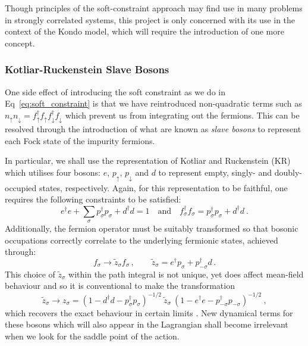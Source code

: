 Though principles of the soft-constraint approach may find use in many problems in strongly correlated systems, this project is only concerned with its use in the context of the Kondo model, which will require the introduction of one more concept.

\subsubsection{Kotliar-Ruckenstein Slave Bosons}

One side effect of introducing the soft constraint as we do in Eq~\eqref{eq:soft_constraint} is that we have reintroduced non-quadratic terms such as $ n_{\uparrow} n_{\downarrow} = f^{\dagger}_{\uparrow} f^{}_{\uparrow} f^{\dagger}_{\downarrow} f^{}_{\downarrow} $ which prevent us from integrating out the fermions. This can be resolved through the introduction of what are known as \emph{slave bosons} \cite{SlaveBosons} to represent each Fock state of the impurity fermions.

In particular, we shall use the representation of Kotliar and Ruckenstein (KR) \cite{KotliarRuckenstein} which utilises four bosons: $ e $, $ p_{\uparrow} $, $ p_{\downarrow} $ and $ d $ to represent empty, singly- and doubly-occupied states, respectively. Again, for this representation to be faithful, one requires the following constraints to be satisfied:
\begin{equation}
e^{\dagger} e + \sum_{\sigma} p^{\dagger}_{\sigma} p^{}_{\sigma} + d^{\dagger} d = 1 \quad \text{and} \quad f^{\dagger}_{\sigma} f^{}_{\sigma} = p^{\dagger}_{\sigma} p^{}_{\sigma} + d^{\dagger} d ~.
\end{equation}
Additionally, the fermion operator must be suitably transformed so that bosonic  occupations correctly correlate to the underlying fermionic states, achieved through:
\begin{equation}
f^{}_{\sigma} \rightarrow \widetilde{z}^{}_{\sigma} f^{}_{\sigma}\,, \qquad \widetilde{z}_{\sigma} = e^{\dagger} p^{}_{\sigma} + p^{\dagger}_{-\sigma} d \,.
\end{equation}
This choice of $ \widetilde{z}^{}_{\sigma} $ within the path integral is not unique, yet does affect mean-field behaviour and so it is conventional to make the transformation
\begin{equation}
\widetilde{z}^{}_{\sigma} \rightarrow z^{}_{\sigma} = (1 - d^{\dagger} d - p^{\dagger}_{\sigma} p^{}_{\sigma})^{- 1 / 2} ~ \widetilde{z}^{}_{\sigma} ~ (1 - e^{\dagger} e - p^{\dagger}_{- \sigma} p^{}_{- \sigma})^{- 1 / 2} ~,
\end{equation}
which recovers the exact behaviour in certain limits \cite{SlaveBosons}. New dynamical terms for these bosons which will also appear in the Lagrangian shall become irrelevant when we look for the saddle point of the action.

